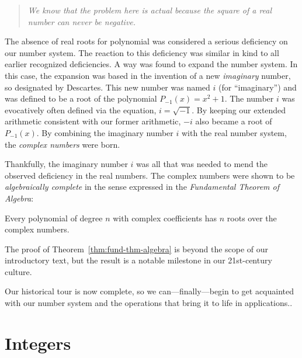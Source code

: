 \begin{quote}
{\em
We know that the problem here is actual because the square of a real
number can never be negative.
}
\end{quote}
The absence of real roots for polynomial was considered a serious
deficiency on our number system.  The reaction to this deficiency was
similar in kind to all earlier recognized deficiencies.  A way was
found to expand the number system.  In this case, the expansion  was
based in the invention of a new {\it imaginary} number,
so designated by Descartes.  This new number was named $i$
(for ``imaginary'') and was defined to be a root of the polynomial
$P_{-1}(x) = x^2 +1$.  The number $i$ was evocatively often defined
via the equation, $i = \sqrt{-1}$.  By keeping our extended arithmetic
consistent with our former arithmetic, $-i$ also became a root of
$P_{-1}(x)$.  By combining the imaginary number $i$ with the real
number system, the {\it complex numbers} were
born.

Thankfully, the imaginary number $i$ was all that was needed to mend
the observed deficiency in the real numbers.  The complex numbers were
shown to be {\it algebraically complete}
in the sense expressed in the {\it Fundamental Theorem of Algebra}:

\begin{theorem}
\label{thm:fund-thm-algebra}
Every polynomial of degree $n$ with complex coefficients has $n$ roots
over the complex numbers.
\end{theorem}

The proof of Theorem~\ref{thm:fund-thm-algebra} is beyond the scope of
our introductory text, but the result is a notable milestone in our
21st-century culture.

Our historical tour is now complete, so we can---finally---begin to
get acquainted with our number system and the operations that bring it
to life in applications..

\section{Integers}
\label{sec:integers}

